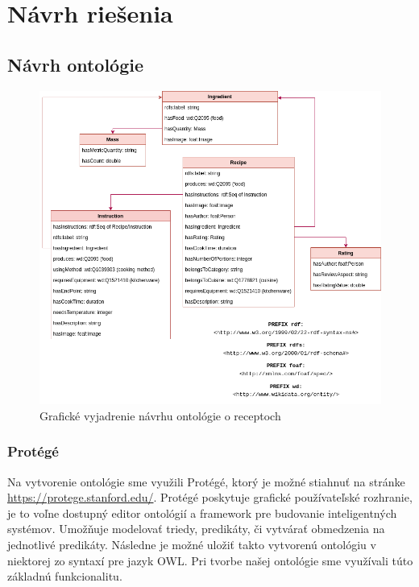 \chapter{Návrh riešenia}
\label{kap:navrh} %

\section{Návrh ontológie}

\begin{figure}[h]
\includegraphics[width=\textwidth]{images/ontology}
\caption{Grafické vyjadrenie návrhu ontológie o receptoch}
\label{ontology}
\end{figure}

\subsection{Protégé}
Na vytvorenie ontológie sme využili Protégé, ktorý je možné stiahnuť na stránke \href{https://protege.stanford.edu/}{https://protege.stanford.edu/}. Protégé poskytuje grafické používateľské rozhranie, je to voľne dostupný editor ontológií a framework pre budovanie inteligentných systémov. Umožňuje modelovať triedy, predikáty, či vytvárať obmedzenia na jednotlivé predikáty. Následne je možné uložiť takto vytvorenú ontológiu v niektorej zo syntaxí pre jazyk OWL. Pri tvorbe našej ontológie sme využívali túto základnú funkcionalitu.

